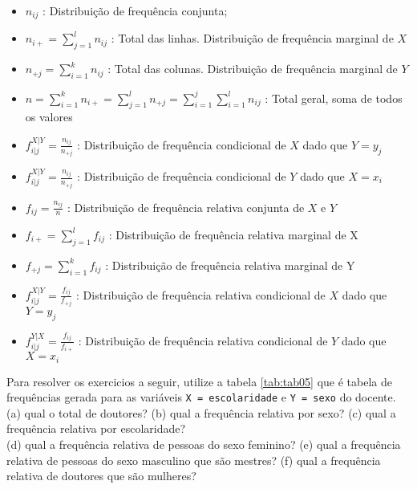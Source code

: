 \documentclass[11pt,]{style/krantz}
\providecommand{\tightlist}{%
  \setlength{\itemsep}{0pt}\setlength{\parskip}{0pt}}
\theoremstyle{definition}
\theoremstyle{definition}
\theoremstyle{definition}
\theoremstyle{remark}
\let\BeginKnitrBlock\begin \let\EndKnitrBlock\end
\begin{document}
\begin{itemize}
\tightlist
\item
  \(n_{ij}\) : Distribuição de frequência conjunta;
\item
  \(n_{i+} = \sum_{j=1}^ln_{ij}\) : Total das linhas. Distribuição de frequência marginal de \(X\)
\item
  \(n_{+j} = \sum_{i=1}^k n_{ij}\) : Total das colunas. Distribuição de frequência marginal de \(Y\)
\item
  \(n = \sum_{i=1}^k n_{i+} = \sum_{j=1}^l n_{+j} = \sum_{i=1}^j \sum_{i=1}^l n_{ij}\) : Total geral, soma de todos os valores
\item
  \(f_{i|j}^{X|Y} = \frac{n_{ij}}{n_{+j}}\) : Distribuição de frequência condicional de \(X\) dado que \(Y=y_j\)
\item
  \(f_{i|j}^{X|Y} = \frac{n_{ij}}{n_{+j}}\) : Distribuição de frequência condicional de \(Y\) dado que \(X=x_i\)
\item
  \(f_{ij} = \frac{n_{ij}}{n}\) : Distribuição de frequência relativa conjunta de \(X\) e \(Y\)
\item
  \(f_{i+} = \sum_{j=1}^{l} f_{ij}\) : Distribuição de frequência relativa marginal de X
\item
  \(f_{+j} = \sum_{i=1}^{k} f_{ij}\) : Distribuição de frequência relativa marginal de Y
\item
  \(f_{i|j}^{X|Y} = \frac{f_{ij}}{f_{+j}}\) : Distribuição de frequência relativa condicional de \(X\) dado que \(Y=y_j\)
\item
  \(f_{i|j}^{Y|X} = \frac{f_{ij}}{f_{i+}}\) : Distribuição de frequência relativa condicional de \(Y\) dado que \(X=x_i\)
\end{itemize}

\BeginKnitrBlock{exercise}
\protect\hypertarget{exr:unnamed-chunk-32}{}{\label{exr:unnamed-chunk-32} }Para resolver os exercicios a seguir, utilize a tabela \ref{tab:tab05} que é tabela de frequências gerada para as variáveis \texttt{X\ =\ escolaridade} e \texttt{Y\ =\ sexo} do docente.
(a) qual o total de doutores?
(b) qual a frequência relativa por sexo?
(c) qual a frequência relativa por escolaridade?\\
(d) qual a frequência relativa de pessoas do sexo feminino?
(e) qual a frequência relativa de pessoas do sexo masculino que são mestres?
(f) qual a frequência relativa de doutores que são mulheres?
\EndKnitrBlock{exercise}
\end{document}
